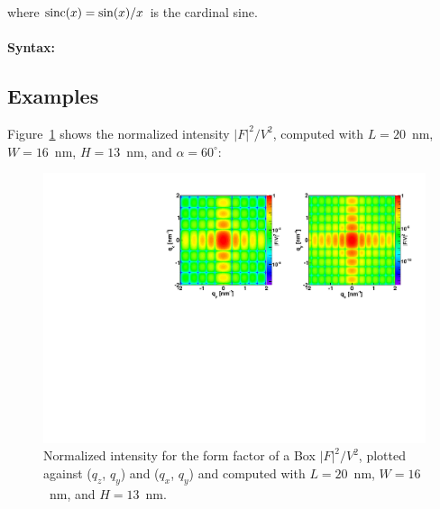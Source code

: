 where $\operatorname{sinc}(x)=\sin(x)/x$ is the cardinal sine.

\paragraph{Syntax:} 

\newpage

\subsection{Examples}
Figure~\ref{fig:FFBoxEx} shows the normalized intensity
$|F|^2/V^2$, computed with $L=20$~nm, $W=16$~nm, $H=13$~nm, and
$\alpha=60^{\circ}$:

\begin{figure}[h]
\begin{center}
\includegraphics[width=\textwidth]{Figures/figffbox}
\end{center}
\caption{Normalized intensity for the form factor of a Box
  $|F|^2/V^2$, plotted against ($q_z$, $q_y$) and  ($q_x$, $q_y$) and computed with $L=20$~nm, $W=16$~nm, and $H=13$~nm.}
\label{fig:FFBoxEx}
\end{figure}

\FloatBarrier


